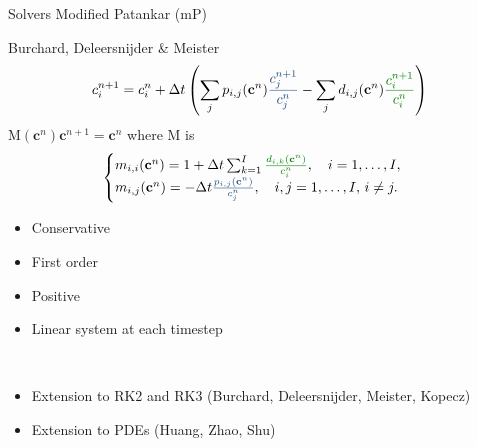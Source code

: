 \documentclass[aspectratio=169]{beamer}
\newcommand{\1}{\begin{pmatrix}
                 1\\
                 1
                \end{pmatrix}}
\def\bc{\mathbf{c}}
\def\M{\mathrm{M}}
\begin{document}
\begin{frame}{Solvers}
Modified Patankar (mP)

Burchard, Deleersnijder \& Meister
\begin{equation}
\begin{split}
c_i^{n+1}= c_i^n +\Delta t \left( \sum_{j} p_{i,j} (\bc^{n}) {\color{lightblue}\frac{c_j^{n+1}}{c_j^n}} -\sum_j d_{i,j}(\bc^{n}){\color{lightgreen}\frac{c_i^{n+1}}{c_i^n}}\right )
\end{split}
\end{equation}
$\M(\bc^n) \bc^{n+1}=\bc^n$ where $\M$ is
\begin{equation}\label{eq:mass_matrix_mod_patankar}
\begin{cases}
m_{i,i}(\bc^n) = 1+\Delta t \sum_{k=1}^I {\color{lightgreen}\frac{d_{i,k}(\bc^n)}{c_i^n}} , \quad i=1,\dots, I,\\
m_{i,j}(\bc^n) = - \Delta t {\color{lightblue}\frac{p_{i,j}(\bc^n)}{c_j^n}} , \quad i,j=1,\dots , I ,\, i\neq j.
\end{cases}
\end{equation}
\begin{minipage}{0.4\textwidth}
\begin{itemize}
\item Conservative
\item First order
\item Positive
\item Linear system at each timestep
\end{itemize}
\end{minipage}\,
\begin{minipage}{0.58\textwidth}
	\begin{itemize}
		\item Extension to RK2 and RK3 (Burchard, Deleersnijder, Meister, Kopecz)
		\item Extension to PDEs (Huang, Zhao, Shu)
	\end{itemize}
\end{minipage}

\end{frame}
\end{document}
